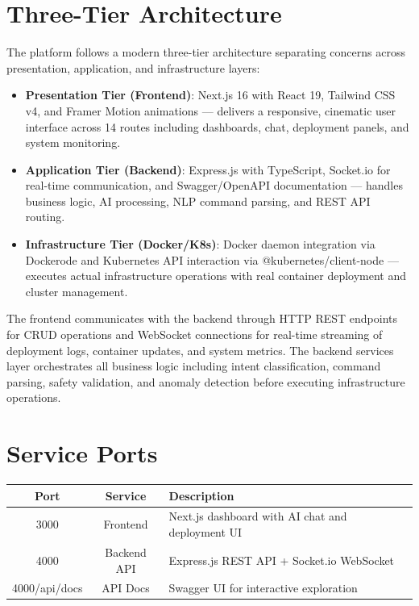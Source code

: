 \documentclass[12pt,a4paper]{report}
\begin{document}
\section{Three-Tier Architecture}
The platform follows a modern three-tier architecture separating concerns across presentation, application, and infrastructure layers:

\begin{itemize}
  \item \textbf{Presentation Tier (Frontend)}: Next.js 16 with React 19, Tailwind CSS v4, and Framer Motion animations --- delivers a responsive, cinematic user interface across 14 routes including dashboards, chat, deployment panels, and system monitoring.
  \item \textbf{Application Tier (Backend)}: Express.js with TypeScript, Socket.io for real-time communication, and Swagger/OpenAPI documentation --- handles business logic, AI processing, NLP command parsing, and REST API routing.
  \item \textbf{Infrastructure Tier (Docker/K8s)}: Docker daemon integration via Dockerode and Kubernetes API interaction via @kubernetes/client-node --- executes actual infrastructure operations with real container deployment and cluster management.
\end{itemize}

The frontend communicates with the backend through HTTP REST endpoints for CRUD operations and WebSocket connections for real-time streaming of deployment logs, container updates, and system metrics. The backend services layer orchestrates all business logic including intent classification, command parsing, safety validation, and anomaly detection before executing infrastructure operations.

\section{Service Ports}
\begin{table}[H]
\centering
\small
\begin{tabularx}{\textwidth}{c c X}
\toprule
\textbf{Port} & \textbf{Service} & \textbf{Description} \\
\midrule
3000 & Frontend & Next.js dashboard with AI chat and deployment UI \\
4000 & Backend API & Express.js REST API + Socket.io WebSocket \\
4000/api/docs & API Docs & Swagger UI for interactive exploration \\
\bottomrule
\end{tabularx}
\end{table}
\end{document}
